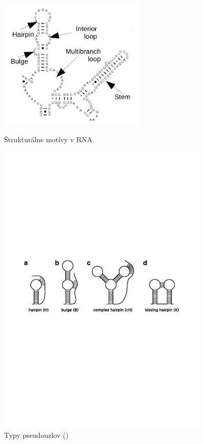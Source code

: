 \begin{figure}
  \centering
  \includegraphics[width=70mm, height=70mm]{../img/struktury_v_rna.png}
  \caption{Štrukturálne motívy v RNA}
  \label{obr:RNA_motifs}
\end{figure}


\begin{figure}
  \includegraphics[clip, trim=0 12cm 0 11cm, width=0.9\textwidth]{../img/pseudoknot}
  \caption{Typy pseudouzlov (\citet{PSEUDOKNOT_TYPES})}
  \label{obr:pseudoknot_types}
\end{figure}




